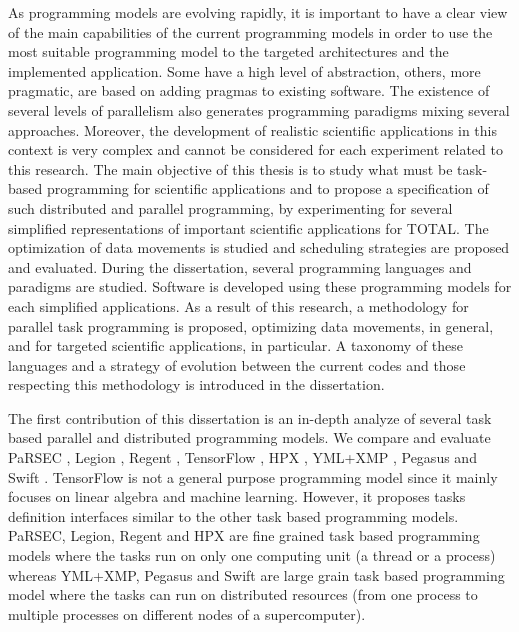 As programming models are evolving rapidly, it is important to have a clear view of the main capabilities of the current programming models in order to use the most suitable programming model to the targeted architectures and the implemented application.
Some have a high level of abstraction, others, more pragmatic, are based on adding pragmas to existing software.
The existence of several levels of parallelism also generates programming paradigms mixing several approaches.
Moreover, the development of realistic scientific applications in this context is very complex and cannot be considered for each experiment related to this research.
The main objective of this thesis is to study what must be task-based programming for scientific applications and to propose a specification of such distributed and parallel programming, by experimenting for several simplified representations of important scientific applications for TOTAL.
The optimization of data movements is studied and scheduling strategies are proposed and evaluated.
During the dissertation, several programming languages and paradigms are studied.
Software is developed using these programming models for each simplified applications.
As a result of this research, a methodology for parallel task programming is proposed, optimizing data movements, in general, and for targeted scientific applications, in particular.
A taxonomy of these languages and a strategy of evolution between the current codes and those respecting this methodology is introduced in the dissertation.

The first contribution of this dissertation is an in-depth analyze of several task based parallel and distributed programming models.
We compare and evaluate PaRSEC \cite{BBDHL2011}, Legion \cite{BaTSA2012}, Regent \cite{SLTBA2015}, TensorFlow \cite{AABBC2016}, HPX \cite{KHASF2014}, YML+XMP \cite{DelaP2004}, Pegasus \cite{DSSBG2005} and Swift \cite{ZHCFL2007}.
TensorFlow is not a general purpose programming model since it mainly focuses on linear algebra and machine learning.
However, it proposes tasks definition interfaces similar to the other task based programming models.
PaRSEC, Legion, Regent and HPX are fine grained task based programming models where the tasks run on only one computing unit (a thread or a process) whereas YML+XMP, Pegasus and Swift are large grain task based programming model where the tasks can run on distributed resources (from one process to multiple processes on different nodes of a supercomputer).


